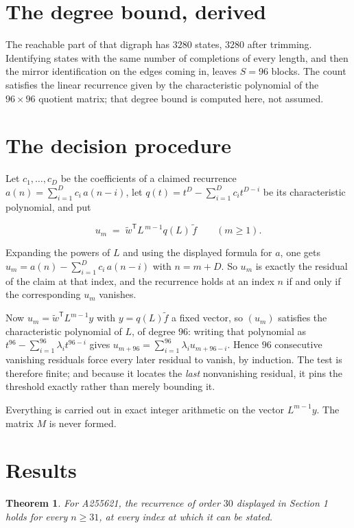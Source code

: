 \documentclass[11pt]{article}
\newtheorem{theorem}{Theorem}
\theoremstyle{definition}
\begin{document}
\section{The degree bound, derived}

The reachable part of that digraph has $3280$ states, $3280$ after trimming. Identifying states with the same number of completions of every length, and then the mirror identification on the edges coming in, leaves $S = 96$ blocks. The count satisfies the linear recurrence given by the characteristic polynomial of the $96\times96$ quotient matrix; that degree bound is computed here, not assumed.

\section{The decision procedure}

Let $c_1,\dots,c_D$ be the coefficients of a claimed recurrence $a(n) = \sum_{i=1}^{D} c_i\,a(n-i)$, let $q(t) = t^{D} - \sum_{i=1}^{D} c_i t^{D-i}$ be its characteristic polynomial, and put

\[u_m \;=\; \tilde w^{\mathsf T} L^{\,m-1} q(L)\,\tilde f \qquad (m \ge 1).\]

Expanding the powers of $L$ and using the displayed formula for $a$, one gets $u_m = a(n) - \sum_{i=1}^{D} c_i\,a(n-i)$ with $n = m + D$. So $u_m$ is exactly the residual of the claim at that index, and the recurrence holds at an index $n$ if and only if the corresponding $u_m$ vanishes.

Now $u_m = \tilde w^{\mathsf T} L^{m-1} y$ with $y = q(L)\tilde f$ a fixed vector, so $(u_m)$ satisfies the characteristic polynomial of $L$, of degree $96$: writing that polynomial as $t^{96} - \sum_{i=1}^{96} \lambda_i t^{96-i}$ gives $u_{m+96} = \sum_{i=1}^{96} \lambda_i u_{m+96-i}$. Hence $96$ consecutive vanishing residuals force every later residual to vanish, by induction. The test is therefore finite; and because it locates the {\itshape last} nonvanishing residual, it pins the threshold exactly rather than merely bounding it.

Everything is carried out in exact integer arithmetic on the vector $L^{m-1}y$. The matrix $M$ is never formed.

\section{Results}

\begin{theorem} For A255621, the recurrence of order $30$ displayed in Section 1 holds for every $n \ge 31$, at every index at which it can be stated.\end{theorem}
\end{document}
